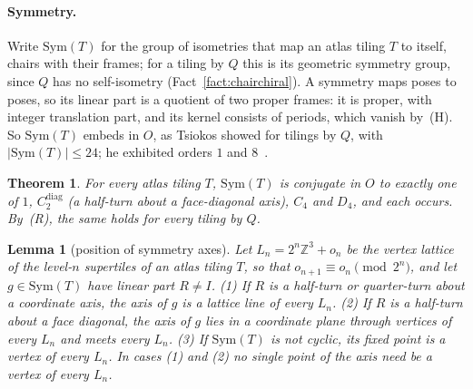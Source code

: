 \documentclass[11pt]{article}
\newtheorem{thm}{Theorem}
\newtheorem{lem}{Lemma}
\theoremstyle{definition}
\theoremstyle{remark}
\begin{document}
\paragraph{Symmetry.}  Write $\mathrm{Sym}(T)$ for the group of isometries that map an atlas tiling $T$ to itself, chairs
with their frames; for a tiling by $Q$ this is its geometric symmetry group, since $Q$ has no self-isometry
(Fact~\ref{fact:chairchiral}).  A symmetry maps poses to poses, so its linear part is a quotient of two proper frames: it is
proper, with integer translation part, and its kernel consists of periods, which vanish by~(H).  So $\mathrm{Sym}(T)$
embeds in $O$, as Tsiokos showed for tilings by $Q$, with $|\mathrm{Sym}(T)|\le24$; he exhibited orders $1$ and
$8$~\cite{Tsiokos1}.

\begin{thm}
\label{thm:sym}
For every atlas tiling $T$, $\mathrm{Sym}(T)$ is conjugate in $O$ to exactly one of $1$, $C_{2}^{\mathrm{diag}}$ (a half-turn
about a face-diagonal axis), $C_{4}$ and $D_{4}$, and each occurs.  By~(R), the same holds for every tiling
by $Q$.
\end{thm}

\begin{lem}[position of symmetry axes]
\label{lem:axes}
Let $L_{n}=2^{n}\mathbb{Z}^{3}+o_{n}$ be the vertex lattice of the level-$n$ supertiles of an atlas tiling $T$, so that
$o_{n+1}\equiv o_{n}\pmod{2^{n}}$, and let $g\in\mathrm{Sym}(T)$ have linear part $R\neq I$.
(1) If $R$ is a half-turn or quarter-turn about a coordinate axis, the axis of $g$ is a lattice line of every $L_{n}$.
(2) If $R$ is a half-turn about a face diagonal, the axis of $g$ lies in a coordinate plane through vertices of every
$L_{n}$ and meets every $L_{n}$.
(3) If $\mathrm{Sym}(T)$ is not cyclic, its fixed point is a vertex of every $L_{n}$.
In cases (1) and (2) no single point of the axis need be a vertex of every $L_{n}$.
\end{lem}
\end{document}
